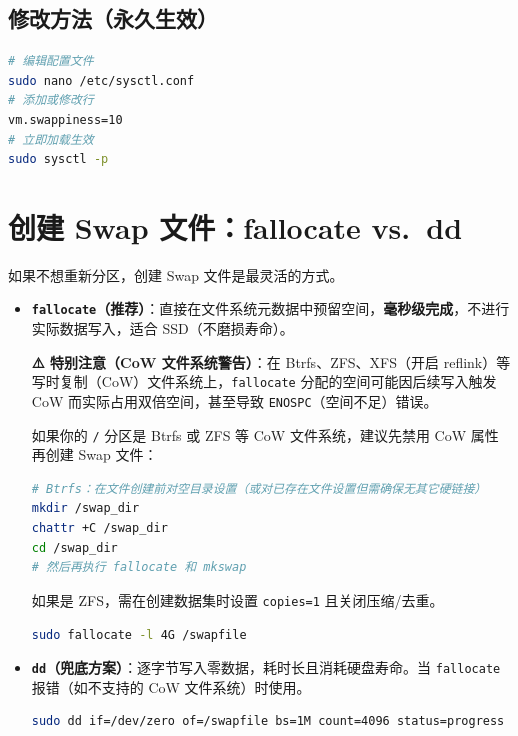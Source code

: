 \subsection*{修改方法（永久生效）}

\begin{lstlisting}[language=bash]
# 编辑配置文件
sudo nano /etc/sysctl.conf
# 添加或修改行
vm.swappiness=10
# 立即加载生效
sudo sysctl -p
\end{lstlisting}

\section{创建 Swap 文件：fallocate vs.\ dd}

如果不想重新分区，创建 Swap 文件是最灵活的方式。

\begin{itemize}[leftmargin=2cm]
	\item \textbf{\texttt{fallocate}（推荐）}：直接在文件系统元数据中预留空间，\textbf{毫秒级完成}，不进行实际数据写入，适合 SSD（不磨损寿命）。

	\textbf{⚠️ 特别注意（CoW 文件系统警告）}：在 Btrfs、ZFS、XFS（开启 reflink）等写时复制（CoW）文件系统上，\texttt{fallocate} 分配的空间可能因后续写入触发 CoW 而实际占用双倍空间，甚至导致 \texttt{ENOSPC}（空间不足）错误。

	如果你的 \texttt{/} 分区是 Btrfs 或 ZFS 等 CoW 文件系统，建议先禁用 CoW 属性再创建 Swap 文件：

\begin{lstlisting}[language=bash]
# Btrfs：在文件创建前对空目录设置（或对已存在文件设置但需确保无其它硬链接）
mkdir /swap_dir
chattr +C /swap_dir
cd /swap_dir
# 然后再执行 fallocate 和 mkswap
\end{lstlisting}

	如果是 ZFS，需在创建数据集时设置 \texttt{copies=1} 且关闭压缩/去重。

\begin{lstlisting}[language=bash]
sudo fallocate -l 4G /swapfile
\end{lstlisting}

	\item \textbf{\texttt{dd}（兜底方案）}：逐字节写入零数据，耗时长且消耗硬盘寿命。当 \texttt{fallocate} 报错（如不支持的 CoW 文件系统）时使用。

\begin{lstlisting}[language=bash]
sudo dd if=/dev/zero of=/swapfile bs=1M count=4096 status=progress
\end{lstlisting}
\end{itemize}

